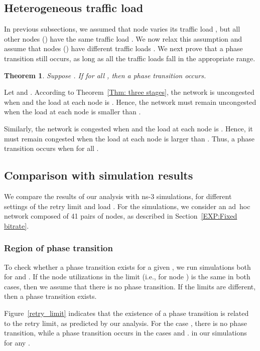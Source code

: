 \documentclass{IEEEtran}
\newtheorem{theorem}{Theorem}
\begin{document}
\subsection{Heterogeneous traffic load}
\label{sec:heter}
In previous subsections, we assumed that node  varies its traffic load
, but all other nodes  () have the same traffic load .
We now relax this assumption and assume that nodes  () have different traffic loads
.
We next prove that a phase transition still occurs, as long as all the traffic loads fall in the appropriate range.



\begin{theorem}
Suppose . If   for all , then a phase transition occurs.
\end{theorem}
\begin{IEEEproof}
Let  and .
According to Theorem~\ref{Thm: three stages}, the network is uncongested when  and the load at each node  is .
Hence, the network must remain uncongested when the load at each node  is smaller than .

Similarly, the network is congested when  and the load at each node  is .
Hence, it must remain congested when the load at each node  is larger than .
Thus, a phase transition occurs when  for all .
\end{IEEEproof}


\subsection{Comparison with simulation results}
\label{Mitigation}
We compare the results of our analysis with ns-3 simulations, for different settings of the retry limit  and load . For the simulations, we
consider an ad~hoc network composed of 41 pairs of nodes, as described in Section~\ref{EXP:Fixed bitrate}. 


\subsubsection{Region of phase transition}
\label{validation of Region of phase transition}
To check whether a phase transition exists for a given , we run simulations both for  and . If the node utilizations in
the limit (i.e., for node ) is the same in both cases, then we assume that there is no phase transition. If the limits are different, then a
phase transition exists.

Figure~\ref{retry_limit} indicates that the existence of a phase transition is related to the retry limit, as predicted by our analysis. For the
case , there is no phase transition, while a phase transition occurs in the cases  and . in our simulations for any .
\end{document}
